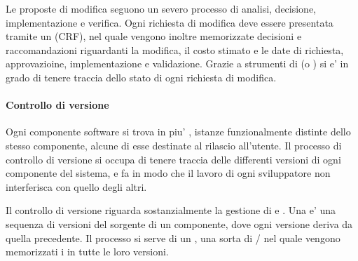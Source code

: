 Le proposte di modifica seguono un severo processo di analisi, decisione, implementazione e verifica. Ogni richiesta di modifica deve essere presentata tramite un  (CRF), nel quale vengono inoltre memorizzate decisioni e raccomandazioni riguardanti la modifica, il costo stimato e le date di richiesta, approvazioine, implementazione e validazione. Grazie a strumenti di  (o ) si e' in grado di tenere traccia dello stato di ogni richiesta di modifica.

\paragraph{Controllo di versione}
Ogni componente software si trova in piu' , istanze funzionalmente distinte dello stesso componente, alcune di esse destinate al rilascio all'utente. Il processo di controllo di versione si occupa di tenere traccia delle differenti versioni di ogni componente del sistema, e fa in modo che il lavoro di ogni sviluppatore non interferisca con quello degli altri.

Il controllo di versione riguarda sostanzialmente la gestione di  e . Una  e' una sequenza di versioni del sorgente di un componente, dove ogni versione deriva da quella precedente. Il processo si serve di un , una sorta di / nel quale vengono memorizzati i  in tutte le loro versioni.

